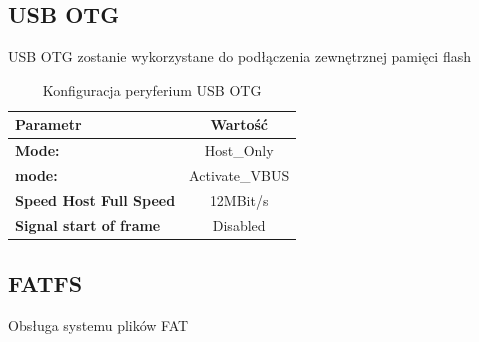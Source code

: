 \documentclass[10pt, a4paper]{article}
\begin{document}
\subsection{USB OTG}

USB OTG zostanie wykorzystane do podłączenia zewnętrznej pamięci flash

\begin{table}[H]
	\centering
	\begin{tabular}{|l|c|} \hline
		\textbf{Parametr} & Wartość \\
		\hline
\hline  \textbf{Mode:} &Host{\_}Only\\
\hline  \textbf{mode:} &Activate{\_}VBUS \\
\hline  \textbf{Speed Host Full Speed} &12MBit/s\\
\hline  \textbf{Signal start of frame} &Disabled\\
 \hline 
	\end{tabular}
	\caption{Konfiguracja peryferium USB OTG}
	\label{tab:USART}
\end{table}
\newpage
\subsection{FATFS}
 Obsługa systemu plików FAT
\end{document}
